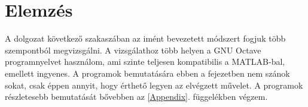 \documentclass[a4paper,12pt]{report}
\begin{document}






\section{Elemzés}





                A dolgozat következő szakaszában az imént bevezetett módszert fogjuk több szempontból megvizsgálni. A vizsgálathoz több helyen a GNU Octave programnyelvet használom, ami szinte teljesen kompatibilis a MATLAB-bal, emellett ingyenes. A programok bemutatására ebben a fejezetben nem szánok sokat, csak éppen annyit, hogy érthető legyen az elvégzett művelet. A programok részletesebb bemutatását bővebben az \ref{Appendix}. függelékben végzem.
\end{document}
